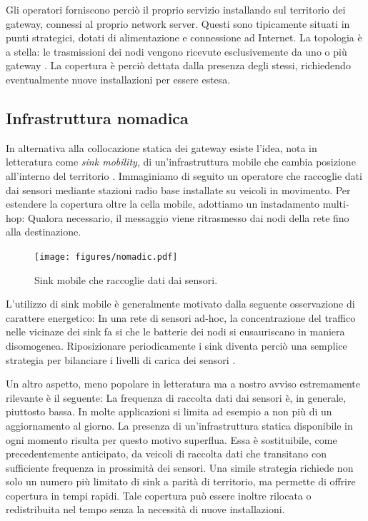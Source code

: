 \documentclass[a4paper,12pt]{article}
\theoremstyle{definition}
\begin{document}

Gli operatori forniscono perciò il proprio servizio installando sul territorio dei gateway, connessi al proprio network server. Questi sono tipicamente situati in punti strategici, dotati di alimentazione e connessione ad Internet. La topologia è a stella: le trasmissioni dei nodi vengono ricevute esclusivemente da uno o più gateway \cite{loraspec}. La copertura è perciò dettata dalla presenza degli stessi, richiedendo eventualmente nuove installazioni per essere estesa.

\subsection{Infrastruttura nomadica}

In alternativa alla collocazione statica dei gateway esiste l'idea, nota in letteratura come \emph{sink mobility}, di un'infrastruttura mobile che cambia posizione all'interno del territorio \cite{sinkmob}. Immaginiamo di seguito un operatore che raccoglie dati dai sensori mediante stazioni radio base installate su veicoli in movimento. Per estendere la copertura oltre la cella mobile, adottiamo un instadamento multi-hop: Qualora necessario, il messaggio viene ritrasmesso dai nodi della rete fino alla destinazione.

\begin{figure}[H]
\centering
\texttt{[image: figures/nomadic.pdf]}
\caption{Sink mobile che raccoglie dati dai sensori.}
\end{figure}

L'utilizzo di sink mobile è generalmente motivato dalla seguente osservazione di carattere energetico: In una rete di sensori ad-hoc, la concentrazione del traffico nelle vicinaze dei sink fa si che le batterie dei nodi si eusauriscano in maniera disomogenea. Riposizionare periodicamente i sink diventa perciò una semplice strategia per bilanciare i livelli di carica dei sensori \cite{moblife1, moblife2}.

Un altro aspetto, meno popolare in letteratura ma a nostro avviso estremamente rilevante è il seguente: La frequenza di raccolta dati dai sensori è, in generale, piuttosto bassa. In molte applicazioni si limita ad esempio a non più di un aggiornamento al giorno. La presenza di un'infrastruttura statica disponibile in ogni momento risulta per questo motivo superflua. Essa è sostituibile, come precedentemente anticipato, da veicoli di raccolta dati che transitano con sufficiente frequenza in prossimità dei sensori. Una simile strategia richiede non solo un numero più limitato di sink a parità di territorio, ma permette di offrire copertura in tempi rapidi. Tale copertura può essere inoltre rilocata o redistribuita nel tempo senza la necessità di nuove installazioni.
\end{document}
